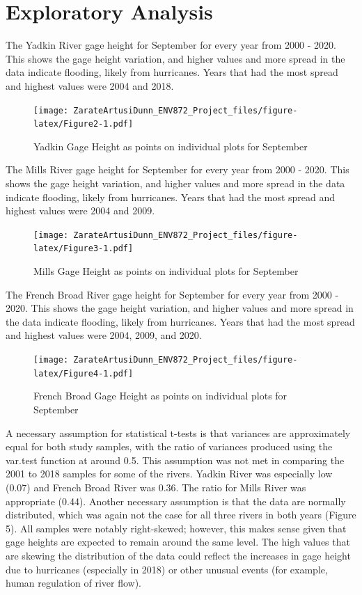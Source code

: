 \documentclass[
  12pt,
]{article}
\begin{document}
\newpage

\hypertarget{exploratory-analysis}{%
\section{Exploratory Analysis}\label{exploratory-analysis}}

The Yadkin River gage height for September for every year from 2000 -
2020. This shows the gage height variation, and higher values and more
spread in the data indicate flooding, likely from hurricanes. Years that
had the most spread and highest values were 2004 and 2018.

\begin{figure}
\centering
\texttt{[image: ZarateArtusiDunn\_ENV872\_Project\_files/figure-latex/Figure2-1.pdf]}
\caption{Yadkin Gage Height as points on individual plots for September}
\end{figure}

\newpage

The Mills River gage height for September for every year from 2000 -
2020. This shows the gage height variation, and higher values and more
spread in the data indicate flooding, likely from hurricanes. Years that
had the most spread and highest values were 2004 and 2009.

\begin{figure}
\centering
\texttt{[image: ZarateArtusiDunn\_ENV872\_Project\_files/figure-latex/Figure3-1.pdf]}
\caption{Mills Gage Height as points on individual plots for September}
\end{figure}

\newpage

The French Broad River gage height for September for every year from
2000 - 2020. This shows the gage height variation, and higher values and
more spread in the data indicate flooding, likely from hurricanes. Years
that had the most spread and highest values were 2004, 2009, and 2020.

\begin{figure}
\centering
\texttt{[image: ZarateArtusiDunn\_ENV872\_Project\_files/figure-latex/Figure4-1.pdf]}
\caption{French Broad Gage Height as points on individual plots for
September}
\end{figure}

\newpage

A necessary assumption for statistical t-tests is that variances are
approximately equal for both study samples, with the ratio of variances
produced using the var.test function at around 0.5. This assumption was
not met in comparing the 2001 to 2018 samples for some of the rivers.
Yadkin River was especially low (0.07) and French Broad River was 0.36.
The ratio for Mills River was appropriate (0.44). Another necessary
assumption is that the data are normally distributed, which was again
not the case for all three rivers in both years (Figure 5). All samples
were notably right-skewed; however, this makes sense given that gage
heights are expected to remain around the same level. The high values
that are skewing the distribution of the data could reflect the
increases in gage height due to hurricanes (especially in 2018) or other
unusual events (for example, human regulation of river flow).
\end{document}

